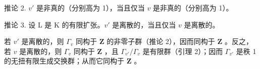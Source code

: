 推论 2. \(v'\) 是非真的（分别高为 1），当且仅当 \(v\) 是非真的（分别高为 1）。

推论 3. 设 L 是 K 的有限扩张。\(v'\) 是离散的，当且仅当 \(v\) 是离散的。

若 \(v'\) 是离散的，则 \(\Gamma_v\) 同构于 \(\mathbf{Z}\) 的非零子群（推论 2），因而同构于 \(\mathbf{Z}\) 。反之，若 \(v\) 是离散的，则 \(\Gamma_v\) 同构于 \(\mathbf{Z}\) ，且 \(\Gamma_{v'} / \Gamma_v\) 是有限群（引理 2）；因而 \(\Gamma_{v'}\) 是秩 1 的无扭有限生成交换群；从而它同构于 \(\mathbf{Z}\) 。

